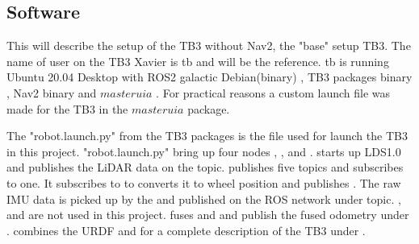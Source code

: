 \subsection{Software}

This will describe the setup of the TB3 without Nav2, the "base" setup TB3.  
The name of user on the TB3 Xavier is tb and will be the reference. tb is running Ubuntu 20.04 Desktop \cite{ubuntu20_04} with ROS2 galactic Debian(binary) \cite{rosgalacticinstall}, TB3 packages binary \cite{turtlebot3galactic}, Nav2 binary \cite{rosnavinstall} and $masteruia$ \cite{masteruia}. For practical reasons a custom launch file was made for the TB3 in the $masteruia$ package. 

The "robot.launch.py" from the TB3 packages is the file used for launch the TB3 in this project. "robot.launch.py" bring up four nodes , ,  and . 
 starts up LDS1.0 and publishes the LiDAR data on the  topic.  publishes five topics and subscribes to one. It subscribes to to  converts it to wheel position and publishes . The raw IMU data is picked up by the  and published on the ROS network under  topic. ,  and  are not used in this project. 
 fuses  and  and publish the fused odometry under . 
 combines the URDF and  for a complete description of the TB3 under .


